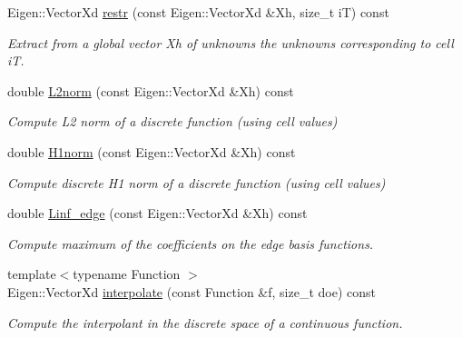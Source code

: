 \begin{DoxyCompactItemize}
Eigen\+::\+Vector\+Xd \hyperlink{classHArDCore2D_1_1HybridCore_a02b46a742045262030431b73eb112f9c}{restr} (const Eigen\+::\+Vector\+Xd \&Xh, size\+\_\+t iT) const
\begin{DoxyCompactList}\small\item\em Extract from a global vector Xh of unknowns the unknowns corresponding to cell iT. \end{DoxyCompactList}\item 
\mbox{\label{classHArDCore2D_1_1HybridCore_a6c2a3d4fde899dde50fda5d97eafdc07}} 
double \hyperlink{classHArDCore2D_1_1HybridCore_a6c2a3d4fde899dde50fda5d97eafdc07}{L2norm} (const Eigen\+::\+Vector\+Xd \&Xh) const
\begin{DoxyCompactList}\small\item\em Compute L2 norm of a discrete function (using cell values) \end{DoxyCompactList}\item 
\mbox{\label{classHArDCore2D_1_1HybridCore_a5962007697ffc13367070f7c4bcbe875}} 
double \hyperlink{classHArDCore2D_1_1HybridCore_a5962007697ffc13367070f7c4bcbe875}{H1norm} (const Eigen\+::\+Vector\+Xd \&Xh) const
\begin{DoxyCompactList}\small\item\em Compute discrete H1 norm of a discrete function (using cell values) \end{DoxyCompactList}\item 
\mbox{\label{classHArDCore2D_1_1HybridCore_ac8878fba08f008f5ecbaa69a9a084904}} 
double \hyperlink{classHArDCore2D_1_1HybridCore_ac8878fba08f008f5ecbaa69a9a084904}{Linf\+\_\+edge} (const Eigen\+::\+Vector\+Xd \&Xh) const
\begin{DoxyCompactList}\small\item\em Compute maximum of the coefficients on the edge basis functions. \end{DoxyCompactList}\item 
{\footnotesize template$<$typename Function $>$ }\\Eigen\+::\+Vector\+Xd \hyperlink{group__HybridCore_ga71c953efc96f467cb24faa1b60ee9bb2}{interpolate} (const Function \&f, size\+\_\+t doe) const
\begin{DoxyCompactList}\small\item\em Compute the interpolant in the discrete space of a continuous function. \end{DoxyCompactList}\item 

\end{DoxyCompactItemize}
